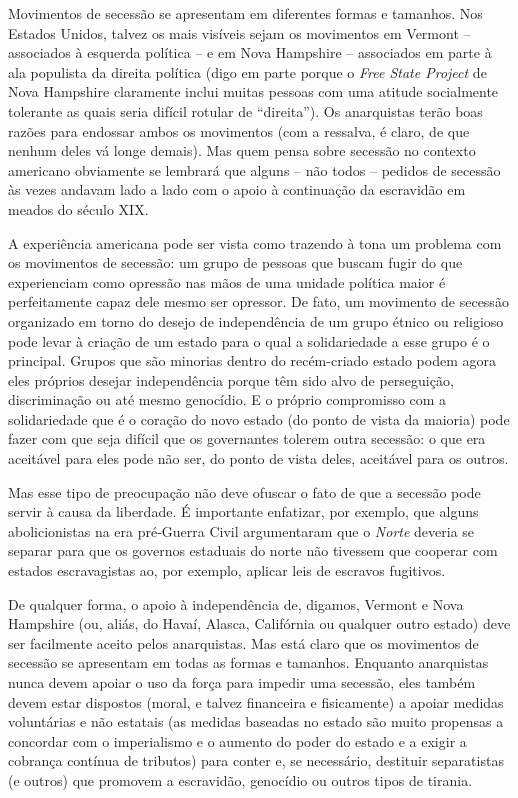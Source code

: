 Movimentos de secessão se apresentam em diferentes formas e tamanhos. Nos Estados Unidos, talvez os mais visíveis sejam os movimentos em Vermont -- associados à esquerda política -- e em Nova Hampshire -- associados em parte à ala populista da direita política (digo em parte porque o \emph{Free State Project} de Nova Hampshire claramente inclui muitas pessoas com uma atitude socialmente tolerante as quais seria difícil rotular de ``direita''). Os anarquistas terão boas razões para endossar ambos os movimentos (com a ressalva, é claro, de que nenhum deles vá longe demais). Mas quem pensa sobre secessão no contexto americano obviamente se lembrará que alguns -- não todos -- pedidos de secessão às vezes andavam lado a lado com o apoio à continuação da escravidão em meados do século XIX.

A experiência americana pode ser vista como trazendo à tona um problema com os movimentos de secessão: um grupo de pessoas que buscam fugir do que experienciam como opressão nas mãos de uma unidade política maior é perfeitamente capaz dele mesmo ser opressor. De fato, um movimento de secessão organizado em torno do desejo de independência de um grupo étnico ou religioso pode levar à criação de um estado para o qual a solidariedade a esse grupo é o principal. Grupos que são minorias dentro do recém-criado estado podem agora eles próprios desejar independência porque têm sido alvo de perseguição, discriminação ou até mesmo genocídio. E o próprio compromisso com a solidariedade que é o coração do novo estado (do ponto de vista da maioria) pode fazer com que seja difícil que os governantes tolerem outra secessão: o que era aceitável para eles pode não ser, do ponto de vista deles, aceitável para os outros.

Mas esse tipo de preocupação não deve ofuscar o fato de que a secessão pode servir à causa da liberdade. É importante enfatizar, por exemplo, que alguns abolicionistas na era pré-Guerra Civil argumentaram que o \emph{Norte} deveria se separar para que os governos estaduais do norte não tivessem que cooperar com estados escravagistas ao, por exemplo, aplicar leis de escravos fugitivos.

De qualquer forma, o apoio à independência de, digamos, Vermont e Nova Hampshire (ou, aliás, do Havaí, Alasca, Califórnia ou qualquer outro estado) deve ser facilmente aceito pelos anarquistas. Mas está claro que os movimentos de secessão se apresentam em todas as formas e tamanhos. Enquanto anarquistas nunca devem apoiar o uso da força para impedir uma secessão, eles também devem estar dispostos (moral, e talvez financeira e fisicamente) a apoiar medidas voluntárias e não estatais (as medidas baseadas no estado são muito propensas a concordar com o imperialismo e o aumento do poder do estado e a exigir a cobrança contínua de tributos) para conter e, se necessário, destituir separatistas (e outros) que promovem a escravidão, genocídio ou outros tipos de tirania.


